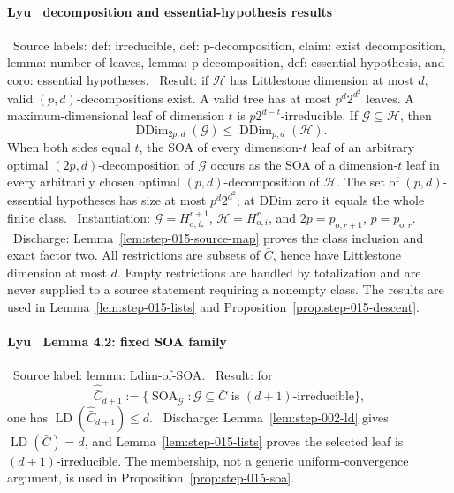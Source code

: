 \paragraph{Lyu~\citep{lyu2025} decomposition and essential-hypothesis results}

\noindent\textbullet\ Source labels: def: irreducible, def: p-decomposition,
  claim: exist decomposition, lemma: number of leaves,
  lemma: p-decomposition, def: essential hypothesis, and
  coro: essential hypotheses.
\noindent\textbullet\ Result: if \(\mathcal H\) has Littlestone dimension at most
  \(d\), valid \((p,d)\)-decompositions exist. A valid tree has at most
  \(p^d2^{d^2}\) leaves. A maximum-dimensional leaf of dimension \(t\) is
  \(p2^{d-t}\)-irreducible. If
  \(\mathcal G\subseteq\mathcal H\), then
  \[
  \operatorname{DDim}_{2p,d}(\mathcal G)
  \le\operatorname{DDim}_{p,d}(\mathcal H).
  \tag{C2}
  \]
  When both sides equal \(t\), the SOA of every dimension-\(t\) leaf of an
  arbitrary optimal \((2p,d)\)-decomposition of \(\mathcal G\) occurs as
  the SOA of a dimension-\(t\) leaf in every arbitrarily chosen optimal
  \((p,d)\)-decomposition of \(\mathcal H\). The set of
  \((p,d)\)-essential hypotheses has size at most \(p^d2^{d^2}\); at
  DDim zero it equals the whole finite class.
\noindent\textbullet\ Instantiation: \(\mathcal G=H_{\mathrm o,i_*}^{r+1}\),
  \(\mathcal H=H_{\mathrm o,i}^{r}\), and
  \(2p=p_{\mathrm o,r+1}\), \(p=p_{\mathrm o,r}\).
\noindent\textbullet\ Discharge: Lemma~\ref{lem:step-015-source-map} proves the class inclusion
  and exact factor two. All restrictions are subsets of \(\bar C\), hence
  have Littlestone dimension at most \(d\). Empty restrictions are handled
  by totalization and are never supplied to a source statement requiring a
  nonempty class. The results are used in
  Lemma~\ref{lem:step-015-lists} and
  Proposition~\ref{prop:step-015-descent}.

\paragraph{Lyu~\citep{lyu2025} Lemma 4.2: fixed SOA family}

\noindent\textbullet\ Source label: lemma: Ldim-of-SOA.
\noindent\textbullet\ Result: for
  \[
  \widehat{\bar C}_{d+1}
  :=\{\operatorname{SOA}_{\mathcal G}:
      \mathcal G\subseteq\bar C
      \text{ is }(d+1)\text{-irreducible}\},
  \tag{C3}
  \]
  one has
  \(\operatorname{LD}(\widehat{\bar C}_{d+1})\le d\).
\noindent\textbullet\ Discharge: Lemma~\ref{lem:step-002-ld} gives
  \(\operatorname{LD}(\bar C)=d\), and
  Lemma~\ref{lem:step-015-lists} proves the selected leaf is
  \((d+1)\)-irreducible. The membership, not a generic uniform-convergence
  argument, is used in Proposition~\ref{prop:step-015-soa}.


